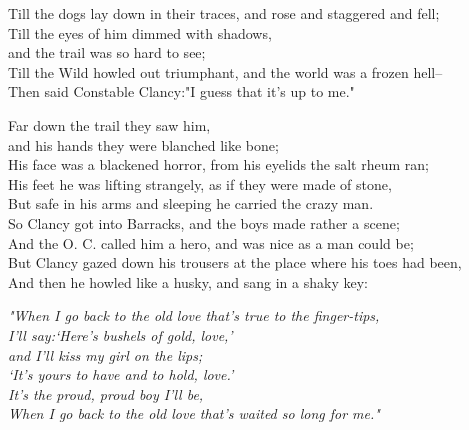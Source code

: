 \begin{poemblock}
Till the dogs lay down in their traces, and rose and staggered and fell;\\
\idt Till the eyes of him dimmed with shadows,\\
and the trail was so hard to see;\\
Till the Wild howled out triumphant, and the world was a frozen hell--\\
\idt Then said Constable Clancy:\idt "I guess that it's up to me."

 Far down the trail they saw him,\\
\idt and his hands they were blanched like bone;\\
\idt His face was a blackened horror, from his eyelids the salt rheum ran;\\
 His feet he was lifting strangely, as if they were made of stone,\\
\idt But safe in his arms and sleeping he carried the crazy man.\\

 So Clancy got into Barracks, and the boys made rather a scene;\\
\idt And the O. C. called him a hero, and was nice as a man could be;\\
 But Clancy gazed down his trousers at the place where his toes had been,\\
\idt And then he howled like a husky, and sang in a shaky key:

\textit{
"When I go back to the old love that's true to the finger-tips,\\
\idt I'll say:\idt `Here's bushels of gold, love,'\\
and I'll kiss my girl on the lips;\\
\idt `It's yours to have and to hold, love.'\\
It's the proud, proud boy I'll be,\\
\idt When I go back to the old love that's waited so long for me."
}

\end{poemblock}
